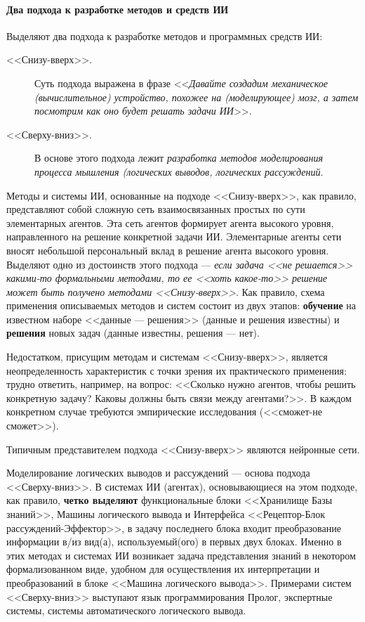 \documentclass[12pt, openany, twoside]{book} %
\def\rem#1{}
\newenvironment{mygroup}{}{}
\begin{document}
\paragraph{Два подхода к разработке методов и средств ИИ}
\begin{mygroup}
\small\sf
Выделяют два подхода к разработке методов и программных средств ИИ:
\begin{description}
\item[<<Снизу-вверх>>.] Суть подхода выражена в фразе <<{\em Давайте создадим механическое (вычислительное) устройство, похожее на (моделирующее) мозг, а затем посмотрим как оно будет решать задачи ИИ}>>.
\item[<<Сверху-вниз>>.] В основе этого подхода лежит {\em разработка методов моделирования процесса мышления (логических выводов, логических рассуждений}.
\end{description}

Методы и системы ИИ, основанные на подходе <<Снизу-вверх>>, как правило, представляют собой сложную сеть взаимосвязанных простых по сути элементарных агентов. Эта сеть агентов формирует агента высокого уровня, направленного на решение конкретной задачи ИИ. Элементарные агенты сети вносят небольшой персональный вклад в решение агента высокого уровня. Выделяют одно из достоинств этого подхода --- {\em если задача <<не решается>> какими-то формальными методами, то ее <<хоть какое-то>> решение может быть получено методами <<Снизу-вверх>>}. Как правило, схема применения описываемых методов и систем состоит из двух этапов: {\bf обучение} на известном наборе <<данные --- решения>> (данные и решения известны) и {\bf решения} новых задач (данные известны, решения --- нет).

Недостатком, присущим методам и системам <<Снизу-вверх>>, является неопределенность характеристик с точки зрения их практического применения: трудно ответить, например, на вопрос: <<Сколько нужно агентов, чтобы решить конкретную задачу? Каковы должны быть связи между агентами?>>. В каждом конкретном случае требуются эмпирические исследования (<<сможет-не сможет>>).

Типичным представителем подхода <<Снизу-вверх>> являются нейронные сети.

Моделирование логических выводов и рассуждений --- основа подхода <<Сверху-вниз>>. В системах ИИ (агентах), основывающиеся на этом подходе, как правило, {\bf четко выделяют} функциональные блоки <<Хранилище Базы знаний>>, Машины логического вывода и Интерфейса <<Ре\-цеп\-тор-Блок рас\-суж\-де\-ний-Эффек\-тор>>, в задачу последнего блока входит преобразование информации в/из вид(а), используемый(ого) в первых двух блоках. Именно в этих методах и системах ИИ возникает задача представления знаний в некотором формализованном виде, удобном для осуществления их интерпретации и преобразований в блоке <<Машина логического вывода>>. Примерами\rem{\footnote{Мы не будем анализировать здесь достоинства и недостатки этих методов, т.~к. все это будет изложено в пособии.}} систем <<Сверху-вниз>> выступают язык программирования Пролог, экспертные системы, системы автоматического логического вывода.

\end{mygroup}
\end{document}
